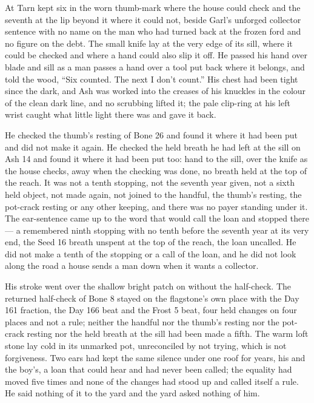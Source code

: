 \scenebreak

At  Tarn kept six in the worn thumb-mark where the house could check and the seventh at the lip beyond it where it could not, beside Garl’s unforged collector sentence with no name on the man who had turned back at the frozen ford and no figure on the debt. The small knife lay at the very edge of its sill, where it could be checked and where a hand could also slip it off. He passed his hand over blade and sill as a man passes a hand over a tool put back where it belongs, and told the wood, “Six counted. The next I don’t count.” His chest had been tight since the dark, and Ash was worked into the creases of his knuckles in the colour of the clean dark line, and no scrubbing lifted it; the pale clip-ring at his left wrist caught what little light there was and gave it back.

He checked the thumb’s resting of Bone 26 and found it where it had been put and did not make it again. He checked the held breath he had left at the sill on Ash 14 and found it where it had been put too: hand to the sill, over the knife as the house checks, away when the checking was done, no breath held at the top of the reach. It was not a tenth stopping, not the seventh year given, not a sixth held object, not made again, not joined to the handful, the thumb’s resting, the pot-crack resting or any other keeping, and there was no payer standing under it. The ear-sentence came up to the word that would call the loan and stopped there --- a remembered ninth stopping with no tenth before the seventh year at its very end, the Seed 16 breath unspent at the top of the reach, the loan uncalled. He did not make a tenth of the stopping or a call of the loan, and he did not look along the road a house sends a man down when it wants a collector.

His stroke went over the shallow bright patch on  without the half-check. The returned half-check of Bone 8 stayed on the flagstone’s own place with the Day 161 fraction, the Day 166 beat and the Frost 5 beat, four held changes on four places and not a rule; neither the handful nor the thumb’s resting nor the pot-crack resting nor the held breath at the sill had been made a fifth. The warm loft stone lay cold in its unmarked pot, unreconciled by not trying, which is not forgiveness. Two ears had kept the same silence under one roof for years, his and the boy’s, a loan that could hear and had never been called; the equality had moved five times and none of the changes had stood up and called itself a rule. He said nothing of it to the yard and the yard asked nothing of him.

